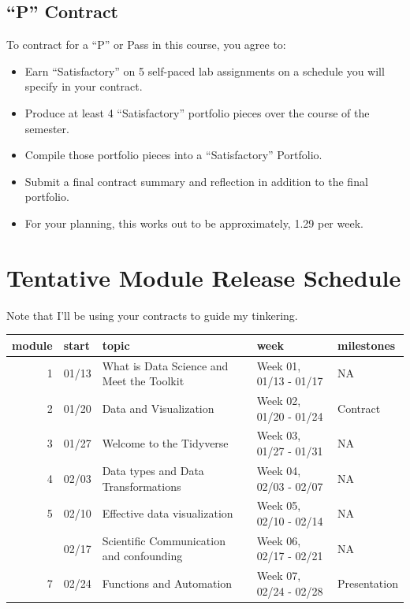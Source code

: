 \documentclass[
]{book}
\begin{document}
\subsection*{``P'' Contract}\label{p-contract}


To contract for a ``P'' or Pass in this course, you agree to:

\begin{itemize}
\item
  Earn ``Satisfactory'' on 5 self-paced lab assignments on a schedule you will specify in your contract.
\item
  Produce at least 4 ``Satisfactory'' portfolio pieces over the course of the semester.
\item
  Compile those portfolio pieces into a ``Satisfactory'' Portfolio.
\item
  Submit a final contract summary and reflection in addition to the final portfolio.
\item
  For your planning, this works out to be approximately, 1.29 per week.
\end{itemize}

\section*{Tentative Module Release Schedule}\label{tentative-module-release-schedule}


Note that I'll be using your contracts to guide my tinkering.

\begin{tabular}{rllll}
\toprule
module & start & topic & week & milestones\\
\midrule
1 & 01/13 & What is Data Science and Meet the Toolkit & Week 01, 01/13 - 01/17 & NA\\
2 & 01/20 & Data and Visualization & Week 02, 01/20 - 01/24 & Contract\\
3 & 01/27 & Welcome to the Tidyverse & Week 03, 01/27 - 01/31 & NA\\
4 & 02/03 & Data types and Data Transformations & Week 04, 02/03 - 02/07 & NA\\
5 & 02/10 & Effective data visualization & Week 05, 02/10 - 02/14 & NA\\
\addlinespace
6 & 02/17 & Scientific Communication and confounding & Week 06, 02/17 - 02/21 & NA\\
7 & 02/24 & Functions and Automation & Week 07, 02/24 - 02/28 & Presentation\\
\bottomrule
\end{tabular}
\end{document}
